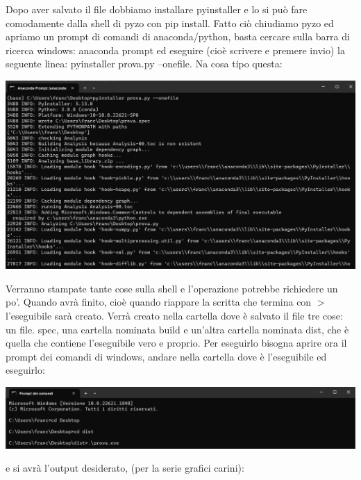 \documentclass[10pt,a4paper]{article}
\begin{document}
Dopo aver salvato il file dobbiamo installare pyinstaller e lo si può fare comodamente dalla shell di pyzo con pip install.
Fatto ciò chiudiamo pyzo ed apriamo un prompt di comandi di anaconda/python, basta cercare sulla barra di ricerca windows: anaconda prompt ed eseguire (cioè scrivere e premere invio) la seguente linea: pyinstaller prova.py --onefile. Na cosa tipo questa:

\begin{center}
\includegraphics[scale=0.35]{img/p_1.png}
\end{center}
Verranno stampate tante cose sulla shell e l'operazione potrebbe richiedere un po'. Quando avrà finito, cioè quando riappare la scritta che termina con $>$ l'eseguibile sarà creato. Verrà creato nella cartella dove è salvato il file tre cose: un file. spec, una cartella nominata build e un'altra cartella nominata dist, che è quella che contiene l'eseguibile vero e proprio. Per eseguirlo bisogna aprire ora il prompt dei comandi di windows, andare nella cartella dove è l'eseguibile ed eseguirlo:

\begin{center}
\includegraphics[scale=0.35]{img/p_2.png}
\end{center}
e si avrà l'output desiderato, (per la serie grafici carini):
\end{document}
